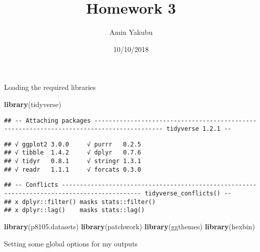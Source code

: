 \documentclass[]{article}
\title{Homework 3}
\author{Amin Yakubu}
\date{10/10/2018}
\newenvironment{Shaded}{\begin{snugshade}}{\end{snugshade}}
\newcommand{\KeywordTok}[1]{\textcolor[rgb]{0.13,0.29,0.53}{\textbf{#1}}}
\newcommand{\DataTypeTok}[1]{\textcolor[rgb]{0.13,0.29,0.53}{#1}}
\newcommand{\DecValTok}[1]{\textcolor[rgb]{0.00,0.00,0.81}{#1}}
\newcommand{\StringTok}[1]{\textcolor[rgb]{0.31,0.60,0.02}{#1}}
\newcommand{\OperatorTok}[1]{\textcolor[rgb]{0.81,0.36,0.00}{\textbf{#1}}}
\newcommand{\NormalTok}[1]{#1}
\begin{document}
\maketitle

Loading the required libraries

\begin{Shaded}
\begin{Highlighting}[]
\KeywordTok{library}\NormalTok{(tidyverse)}
\end{Highlighting}
\end{Shaded}

\begin{verbatim}
## -- Attaching packages ----------------------------------------------------------------------------------------- tidyverse 1.2.1 --
\end{verbatim}

\begin{verbatim}
## √ ggplot2 3.0.0     √ purrr   0.2.5
## √ tibble  1.4.2     √ dplyr   0.7.6
## √ tidyr   0.8.1     √ stringr 1.3.1
## √ readr   1.1.1     √ forcats 0.3.0
\end{verbatim}

\begin{verbatim}
## -- Conflicts -------------------------------------------------------------------------------------------- tidyverse_conflicts() --
## x dplyr::filter() masks stats::filter()
## x dplyr::lag()    masks stats::lag()
\end{verbatim}

\begin{Shaded}
\begin{Highlighting}[]
\KeywordTok{library}\NormalTok{(p8105.datasets)}
\KeywordTok{library}\NormalTok{(patchwork)}
\KeywordTok{library}\NormalTok{(ggthemes)}
\KeywordTok{library}\NormalTok{(hexbin)}
\end{Highlighting}
\end{Shaded}

Setting some global options for my outputs

\begin{Shaded}
\end{Shaded}
\end{document}
